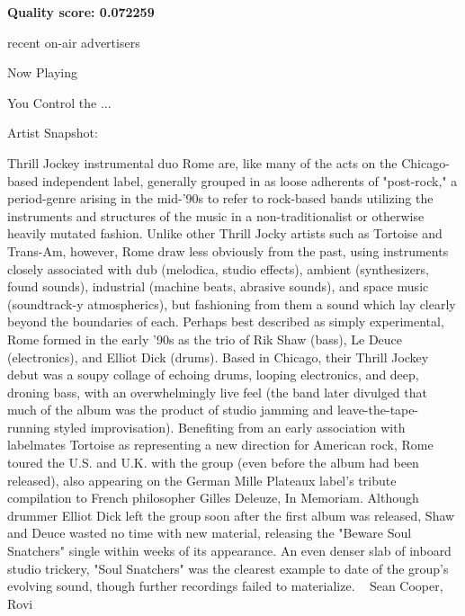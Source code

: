 \documentclass[conference]{IEEEtran}
\begin{document}
\textbf{Quality score: 0.072259}
\begin{textbox}
recent on-air advertisers

Now Playing

You Control the ...


Artist Snapshot:


    Thrill Jockey instrumental duo Rome are, like many of the acts on the Chicago-based independent label, generally grouped in as loose adherents of "post-rock," a period-genre arising in the mid-'90s to refer to rock-based bands utilizing the instruments and structures of the music in a non-traditionalist or otherwise heavily mutated fashion. Unlike other Thrill Jocky artists such as Tortoise and Trans-Am, however, Rome draw less obviously from the past, using instruments closely associated with dub (melodica, studio effects), ambient (synthesizers, found sounds), industrial (machine beats, abrasive sounds), and space music (soundtrack-y atmospherics), but fashioning from them a sound which lay clearly beyond the boundaries of each. Perhaps best described as simply experimental, Rome formed in the early '90s as the trio of Rik Shaw (bass), Le Deuce (electronics), and Elliot Dick (drums). Based in Chicago, their Thrill Jockey debut was a soupy collage of echoing drums, looping electronics, and deep, droning bass, with an overwhelmingly live feel (the band later divulged that much of the album was the product of studio jamming and leave-the-tape-running styled improvisation). Benefiting from an early association with labelmates Tortoise as representing a new direction for American rock, Rome toured the U.S. and U.K. with the group (even before the album had been released), also appearing on the German Mille Plateaux label's tribute compilation to French philosopher Gilles Deleuze, In Memoriam. Although drummer Elliot Dick left the group soon after the first album was released, Shaw and Deuce wasted no time with new material, releasing the "Beware Soul Snatchers" single within weeks of its appearance. An even denser slab of inboard studio trickery, "Soul Snatchers" was the clearest example to date of the group's evolving sound, though further recordings failed to materialize. ~ Sean Cooper, Rovi
\end{textbox}
\end{document}
